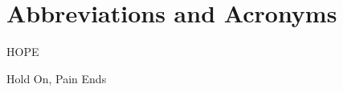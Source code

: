 \chapter{Abbreviations and Acronyms}\label{chapter:abbreviations}

\begin{multicols}{2}

	HOPE

\columnbreak

	Hold On, Pain Ends

\end{multicols}

